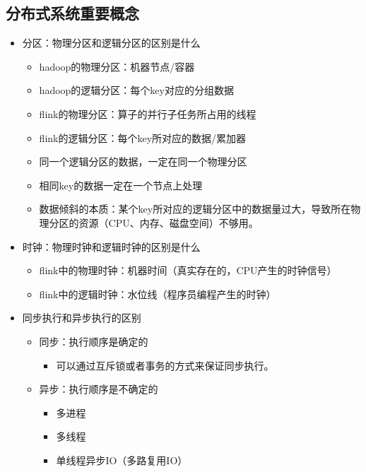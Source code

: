 \hypertarget{ux5206ux5e03ux5f0fux7cfbux7edfux91cdux8981ux6982ux5ff5}{%
\subsection{分布式系统重要概念}\label{ux5206ux5e03ux5f0fux7cfbux7edfux91cdux8981ux6982ux5ff5}}

\begin{itemize}
\tightlist
\item
  分区：物理分区和逻辑分区的区别是什么

  \begin{itemize}
  \tightlist
  \item
    hadoop的物理分区：机器节点/容器
  \item
    hadoop的逻辑分区：每个key对应的分组数据
  \item
    flink的物理分区：算子的并行子任务所占用的线程
  \item
    flink的逻辑分区：每个key所对应的数据/累加器
  \item
    同一个逻辑分区的数据，一定在同一个物理分区
  \item
    相同key的数据一定在一个节点上处理
  \item
    数据倾斜的本质：某个key所对应的逻辑分区中的数据量过大，导致所在物理分区的资源（CPU、内存、磁盘空间）不够用。
  \end{itemize}
\item
  时钟：物理时钟和逻辑时钟的区别是什么

  \begin{itemize}
  \tightlist
  \item
    flink中的物理时钟：机器时间（真实存在的，CPU产生的时钟信号）
  \item
    flink中的逻辑时钟：水位线（程序员编程产生的时钟）
  \end{itemize}
\item
  同步执行和异步执行的区别

  \begin{itemize}
  \tightlist
  \item
    同步：执行顺序是确定的

    \begin{itemize}
    \tightlist
    \item
      可以通过互斥锁或者事务的方式来保证同步执行。
    \end{itemize}
  \item
    异步：执行顺序是不确定的

    \begin{itemize}
    \tightlist
    \item
      多进程
    \item
      多线程
    \item
      单线程异步IO（多路复用IO）
    \end{itemize}
  \end{itemize}
\end{itemize}

